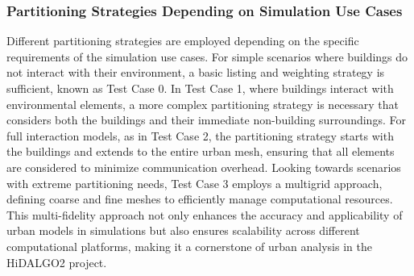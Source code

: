 \documentclass[runningheads]{llncs}
\begin{document}
\subsubsection{Partitioning Strategies Depending on Simulation Use Cases}
Different partitioning strategies are employed depending on the specific requirements of the simulation use cases. For simple scenarios where buildings do not interact with their environment, a basic listing and weighting strategy is sufficient, known as Test Case 0. In Test Case 1, where buildings interact with environmental elements, a more complex partitioning strategy is necessary that considers both the buildings and their immediate non-building surroundings. For full interaction models, as in Test Case 2, the partitioning strategy starts with the buildings and extends to the entire urban mesh, ensuring that all elements are considered to minimize communication overhead. Looking towards scenarios with extreme partitioning needs, Test Case 3 employs a multigrid approach, defining coarse and fine meshes to efficiently manage computational resources. This multi-fidelity approach not only enhances the accuracy and applicability of urban models in simulations but also ensures scalability across different computational platforms, making it a cornerstone of urban analysis in the HiDALGO2 project.
\end{document}
